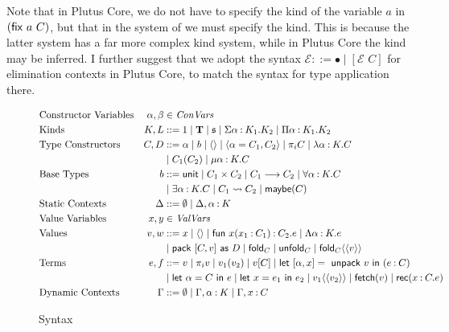 \documentclass{article}
\renewcommand{\:}{\mathbin{:}}
\begin{document}
Note that in Plutus Core, we do not have to specify the kind of the variable $a$ in $({\sf fix}\,\, a\,\, C)$, but that in the system of \cite{Dreyer05} we must specify the kind. This is because the latter system has a far more complex kind system, while in Plutus Core the kind may be inferred. I further suggest that we adopt the syntax $\mathcal{E} ::= \bullet \mid [ \mathcal{E}\,\, C]$ for elimination contexts in Plutus Core, to match the syntax for type application there.

\begin{figure}
\begin{align*}
  & \text{Constructor Variables} &\alpha, \beta &\in \textit{ConVars}\\
  & \text{Kinds} &K,L  &::= 1 \mid \textbf{T} \mid \mathfrak{s} \mid \Sigma \alpha \: K_1.K_2 \mid \Pi\alpha\:K_1.K_2 \\
  & \text{Type Constructors} &C,D  &::= \alpha \mid b \mid \langle \rangle \mid \langle \alpha = C_1,C_2 \rangle \mid \pi_iC \mid \lambda \alpha \: K.C \\
  &&& \mid C_1(C_2) \mid \mu\alpha\: K .C\\
  & \text{Base Types} & b & ::= \text{{\sf unit}} \mid C_1 \times C_2 \mid C_1 \longrightarrow C_2 \mid \forall \alpha \: K.C
  \\ &&& \mid \exists \alpha \: K .C \mid C_1 \rightsquigarrow C_2 \mid \text{{\sf maybe}}(C) \\
  & \text{Static Contexts} & \Delta & ::= \emptyset \mid \Delta,\alpha \: K\\
  & \text{Value Variables} & x,y & \in \textit{ValVars} \\
  & \text{Values} & v,w & ::= x \mid \langle \rangle \mid \text{{\sf fun} } x(x_1\:C_1)\:C_2.e \mid \Lambda\alpha\:K.e\\
  &&& \mid \text{{\sf pack} } [C,v] \text{ {\sf as} } D \mid \text{{\sf fold}}_C \mid \text{{\sf unfold}}_C \mid \text{{\sf fold}}_C\langle \langle v \rangle \rangle \\
  & \text{Terms} & e,f & ::= v \mid \pi_iv \mid v_1(v_2) \mid v[C] \mid \text{{\sf let} } [\alpha,x] = \text{ {\sf unpack} } v \text{ {\sf in} } (e\:C) \\
  &&& \mid \text{{\sf let} } \alpha = C \text{ {\sf in} } e \mid \text{{\sf let} } x = e_1 \text{ {\sf in} } e_2 \mid v_1 \langle \langle v_2 \rangle \rangle \mid \text{{\sf fetch}}(v) \mid \text{{\sf rec}}(x\:C.e)\\
  & \text{Dynamic Contexts} & \Gamma & ::= \emptyset \mid \Gamma,\alpha\:K \mid \Gamma,x\:C
\end{align*}  
\caption{Syntax}
\end{figure}
\end{document}

